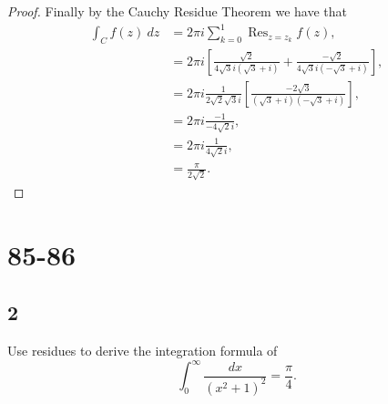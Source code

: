 \documentclass{article}
\DeclareMathOperator*{\Res}{Res}
\begin{document}
\begin{proof}
    Finally by the Cauchy Residue Theorem we have that
    \begin{align*}
        \int_C f(z) \ dz & = 2\pi i \sum_{k=0}^1 \Res_{z=z_k} f(z),                                                                      \\
                         & = 2\pi i\left[\frac{\sqrt{2}}{4\sqrt{3}i(\sqrt{3} + i)} + \frac{-\sqrt{2}}{4\sqrt{3}i(-\sqrt{3} + i)}\right], \\
                         & = 2\pi i\frac{1}{2\sqrt{2}\sqrt{3}i}\left[\frac{-2\sqrt{3}}{(\sqrt{3} + i)(-\sqrt{3} + i)}\right],            \\
                         & = 2\pi i\frac{-1}{-4\sqrt{2}i},                                                                               \\
                         & = 2\pi i \frac{1}{4\sqrt{2}i},                                                                                \\
                         & = \frac{\pi}{2\sqrt{2}}.
    \end{align*}
\end{proof}


\section*{85-86}
\subsection*{2}
Use residues to derive the integration formula of
\[\int_0^\infty \frac{dx}{(x^2 + 1)^2} = \frac{\pi}{4}.\]
\end{document}
